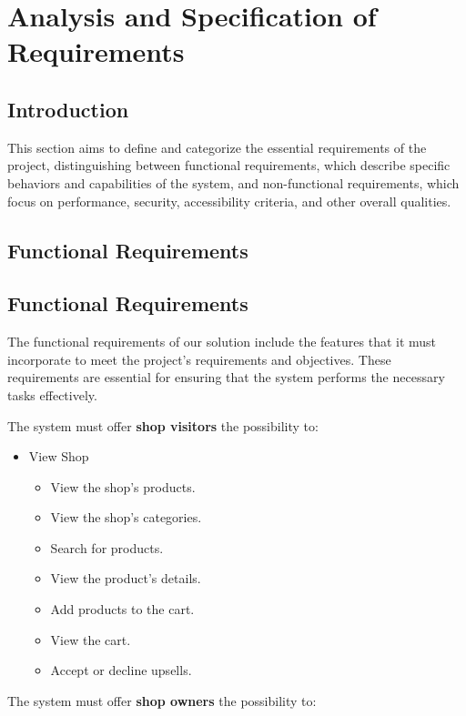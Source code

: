 \chapter{Analysis and Specification of Requirements}
\setcounter{minitocdepth}{1}
\minitoc
\newpage

\section{Introduction}
This section aims to define and categorize the essential requirements of the project, distinguishing between functional requirements, which describe specific behaviors and capabilities of the system, and non-functional requirements, which focus on performance, security, accessibility criteria, and other overall qualities.

\section{Functional Requirements}
\section{Functional Requirements}
The functional requirements of our solution include the features that it must incorporate to meet the project's requirements and objectives. These requirements are essential for ensuring that the system performs the necessary tasks effectively.

The system must offer \textbf{shop visitors} the possibility to:

\begin{itemize}
    \item View Shop
    \begin{itemize}
        \item View the shop's products.
        \item View the shop's categories.
        \item Search for products.
        \item View the product's details.
        \item Add products to the cart.
        \item View the cart.
        \item Accept or decline upsells.
    \end{itemize}
\end{itemize}

The system must offer \textbf{shop owners} the possibility to:

